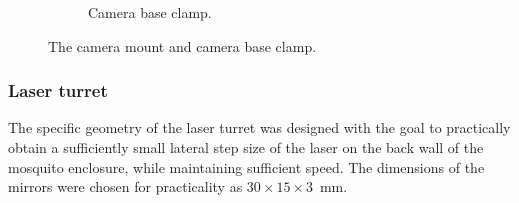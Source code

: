 \begin{figure}[h]
\begin{subfigure}[b]{0.45\textwidth}
        \caption{Camera base clamp.}
        \label{fig:camera_base_clamp}
    \end{subfigure}
    \caption{The camera mount and camera base clamp.}
    \label{fig:camera_mount_and_base_clamp}
\end{figure}



\subsubsection{Laser turret}
The specific geometry of the laser turret was designed with the goal to practically obtain a sufficiently small lateral step size of the laser on the back wall of the mosquito enclosure, while maintaining sufficient speed. The dimensions of the mirrors were chosen for practicality as $30 \times 15 \times 3$~mm.


\label{par:angular_step_size}
